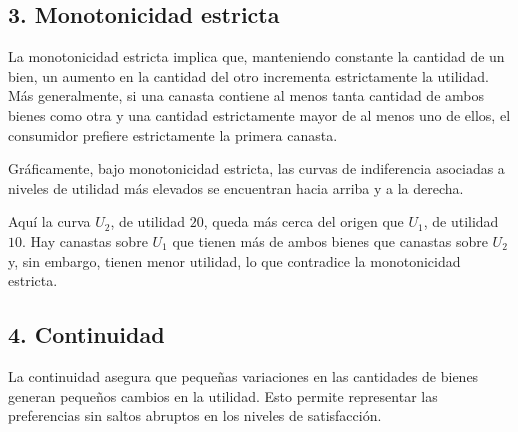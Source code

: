 \documentclass{article}
\begin{document}
\subsection*{3. Monotonicidad estricta}

La {\color{teal}monotonicidad estricta} implica que, manteniendo constante la cantidad de un bien, un aumento en la cantidad del otro incrementa estrictamente la utilidad. Más generalmente, si una canasta contiene al menos tanta cantidad de ambos bienes como otra y una cantidad estrictamente mayor de al menos uno de ellos, el consumidor prefiere estrictamente la primera canasta.

Gráficamente, bajo monotonicidad estricta, las curvas de indiferencia asociadas a {\color{teal}niveles de utilidad más elevados} se encuentran hacia arriba y a la derecha.

\begin{center}
\end{center}

Aquí la curva \(U_2\), de utilidad \(20\), queda {\color{teal}más cerca del origen} que \(U_1\), de utilidad \(10\). Hay canastas sobre \(U_1\) que tienen más de ambos bienes que canastas sobre \(U_2\) y, sin embargo, tienen menor utilidad, lo que contradice la monotonicidad estricta.

\subsection*{4. Continuidad}

La {\color{teal}continuidad} asegura que pequeñas variaciones en las cantidades de bienes generan pequeños cambios en la utilidad. Esto permite representar las preferencias sin {\color{teal}saltos abruptos} en los niveles de satisfacción.
\end{document}
